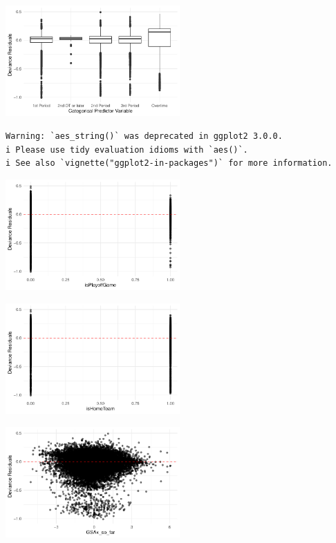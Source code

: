 \documentclass[
  letterpaper,
  DIV=11,
  numbers=noendperiod]{scrartcl}
\begin{document}
\includegraphics[width=0.5\textwidth,height=\textheight]{paper_files/figure-pdf/unnamed-chunk-28-1.pdf}

\begin{verbatim}
Warning: `aes_string()` was deprecated in ggplot2 3.0.0.
i Please use tidy evaluation idioms with `aes()`.
i See also `vignette("ggplot2-in-packages")` for more information.
\end{verbatim}

\includegraphics[width=0.5\textwidth,height=\textheight]{paper_files/figure-pdf/unnamed-chunk-29-1.pdf}

\includegraphics[width=0.5\textwidth,height=\textheight]{paper_files/figure-pdf/unnamed-chunk-30-1.pdf}

\includegraphics[width=0.5\textwidth,height=\textheight]{paper_files/figure-pdf/unnamed-chunk-31-1.pdf}
\end{document}
